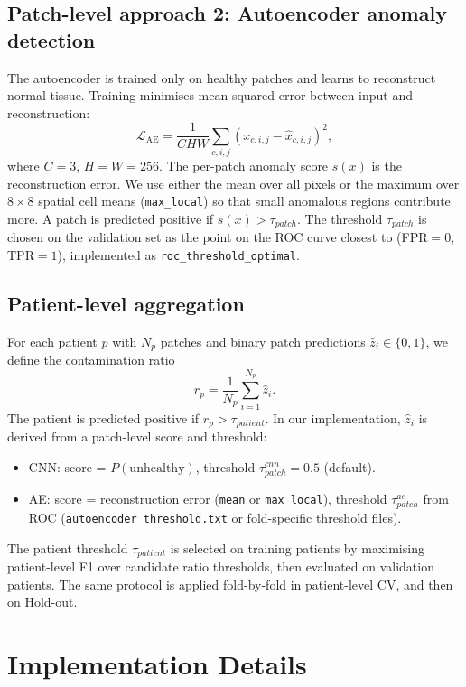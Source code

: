 \documentclass[11pt,a4paper]{article}
\begin{document}
\subsection{Patch-level approach 2: Autoencoder anomaly detection}
The autoencoder is trained only on healthy patches and learns to reconstruct normal tissue. Training minimises mean squared error between input and reconstruction:
\[
\mathcal{L}_{\mathrm{AE}} = \frac{1}{CHW} \sum_{c,i,j} (x_{c,i,j} - \hat{x}_{c,i,j})^2,
\]
where $C=3$, $H=W=256$. The per-patch anomaly score $s(x)$ is the reconstruction error. We use either the mean over all pixels or the maximum over $8\times8$ spatial cell means (\texttt{max\_local}) so that small anomalous regions contribute more. A patch is predicted positive if $s(x) > \tau_{patch}$. The threshold $\tau_{patch}$ is chosen on the validation set as the point on the ROC curve closest to (FPR$=0$, TPR$=1$), implemented as \texttt{roc\_threshold\_optimal}.

\subsection{Patient-level aggregation}
For each patient $p$ with $N_p$ patches and binary patch predictions $\hat{z}_i \in \{0,1\}$, we define the contamination ratio
\[
r_p = \frac{1}{N_p}\sum_{i=1}^{N_p} \hat{z}_i.
\]
The patient is predicted positive if $r_p > \tau_{patient}$. In our implementation, $\hat{z}_i$ is derived from a patch-level score and threshold:
\begin{itemize}
  \item CNN: score = $P(\mathrm{unhealthy})$, threshold $\tau_{patch}^{cnn}=0.5$ (default).
  \item AE: score = reconstruction error (\texttt{mean} or \texttt{max\_local}), threshold $\tau_{patch}^{ae}$ from ROC (\texttt{autoencoder\_threshold.txt} or fold-specific threshold files).
\end{itemize}
The patient threshold $\tau_{patient}$ is selected on training patients by maximising patient-level F1 over candidate ratio thresholds, then evaluated on validation patients. The same protocol is applied fold-by-fold in patient-level CV, and then on Hold-out.

\section{Implementation Details}
\label{sec:implementation}
\end{document}
